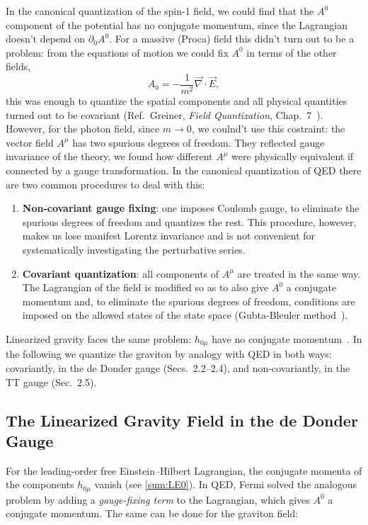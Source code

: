 \documentclass[12pt,a4paper,oneside]{article}
\numberwithin{equation}{section}   %
\begin{document}
In the canonical quantization of the spin-1 field, we could find
that the $A^0$ component of the potential has no conjugate momentum,
 since the Lagrangian doesn't depend on $\partial_0A^0$. 
 For a massive (Proca) field this didn't turn out to be a problem: from the
 equations of motion we could fix $A^0$ in terms of the other fields,
\begin{equation}
    A_0 = -\frac{1}{m^2}\vec{\nabla}\cdot\vec{E},
\end{equation} 
this was enough to quantize the
spatial components and all physical quantities turned out
to be covariant (Ref.\ Greiner,
\textit{Field Quantization}, Chap.~7~\cite{GreinerFQ}).
However, for the photon field,
 since $m\to0$, we coulnd't use this costraint:
  the vector field $A^\mu$ has two spurious degrees of
freedom. They reflected
 gauge invariance of the theory, we found how different $A^\mu$
were physically equivalent if connected by a gauge transformation. 
In the canonical quantization of QED
there are two common procedures to deal with this:

\begin{enumerate}
\item \textbf{Non-covariant gauge fixing}: one imposes
 Coulomb gauge, to eliminate
the spurious degrees of freedom and quantizes the rest. 
This procedure, however, makes us lose manifest
Lorentz invariance and is not convenient for systematically investigating the
perturbative series.
\item \textbf{Covariant quantization}: all components of $A^\mu$ are treated in the
same way. 
The Lagrangian of the field is modified so as to also give $A^0$ a conjugate
momentum and, to eliminate the spurious degrees of freedom, conditions are imposed on
the allowed states of the state space (Gubta-Bleuler method~\cite{GreinerFQ}).
\end{enumerate}

Linearized gravity faces the same problem: $h_{0\mu}$ have
no conjugate momentum~\cite{Rezvan2024}. In the
following we quantize the graviton by analogy with QED
 in both ways: covariantly, in the de Donder
gauge (Secs.~2.2--2.4), and non-covariantly, in the TT gauge (Sec.~2.5).


\subsection{The Linearized Gravity Field in the de Donder Gauge}
For the leading-order free Einstein--Hilbert Lagrangian, the conjugate
momenta of the components $h_{0\mu}$ vanish (see \eqref{sum:LE0}).
In QED, Fermi solved the analogous problem by adding a \textit{gauge-fixing
term} to the Lagrangian, which gives $A^0$ a conjugate momentum. The same can
be done for the graviton field:
\end{document}
